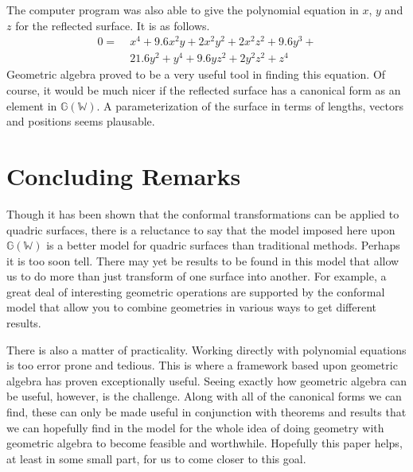 \documentclass{birkjour}
\theoremstyle{definition}
\theoremstyle{remark}
\numberwithin{equation}{section}
\newcommand{\G}{\mathbb{G}}
\newcommand{\W}{\mathbb{W}}
\begin{document}
The computer program was also able to give the polynomial equation in $x$, $y$
and $z$ for the reflected surface.  It is as follows.
\begin{equation}
\begin{split}
0 =\;& x^{4} + 9.6x^{2}y + 2x^{2}y^{2} + 2x^{2}z^{2} + 9.6y^{3} +\\
 & 21.6y^{2} + y^{4} + 9.6yz^{2} + 2y^{2}z^{2} + z^{4}
\end{split}
\end{equation}
Geometric algebra proved to be a very useful tool in finding this equation.
Of course, it would be much nicer if the reflected surface has a canonical
form as an element in $\G(\W)$.  A parameterization of the surface in terms
of lengths, vectors and positions seems plausable.

\section{Concluding Remarks}

Though it has been shown that the conformal transformations can be applied
to quadric surfaces, there is a reluctance to say that the model imposed here upon
$\G(\W)$ is a better model for quadric surfaces than traditional methods.  Perhaps it is too soon tell.
There may yet be results to be found in this model that allow us to do more than just
transform of one surface into another.  For example, a great deal of interesting geometric
operations are supported by the conformal model that allow you to combine
geometries in various ways to get different results.

There is also a matter of practicality.  Working directly with polynomial equations
is too error prone and tedious.  This is where a framework based upon geometric algebra
has proven exceptionally useful.  Seeing exactly how geometric algebra can be useful,
however, is the challenge.  Along with all of the canonical forms we can find, these can
only be made useful in conjunction with theorems and results that we can hopefully
find in the model for the whole idea of doing geometry with geometric algebra to become feasible
and worthwhile.
Hopefully this paper helps, at least in some small part, for us to come closer to this goal.



\end{document}
